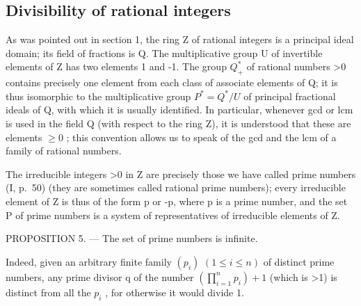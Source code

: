 \subsection{Divisibility of rational integers}

As was pointed out in section 1, the ring Z of rational integers is a principal ideal domain; its field of fractions is Q. The multiplicative group U of invertible elements of Z has two elements 1 and -1. The group \(Q_{+}^{*}\) of rational numbers \textgreater0 contains precisely one element from each class of associate elements of Q; it is thus isomorphic to the multiplicative group \(P^{*} = Q^{*}/U\) of principal fractional ideals of Q, with which it is usually identified. In particular, whenever gcd or lcm is used in the field Q (with respect to the ring Z), it is understood that these are elements \(\geqslant 0\) ; this convention allows us to speak of the gcd and the lcm of a family of rational numbers.

The irreducible integers \textgreater0 in Z are precisely those we have called prime numbers (I, p.~50) (they are sometimes called rational prime numbers); every irreducible element of Z is thus of the form p or -p, where p is a prime number, and the set P of prime numbers is a system of representatives of irreducible elements of Z.

PROPOSITION 5. --- The set of prime numbers is infinite.

Indeed, given an arbitrary finite family \((p_{i})\) \((1 \leqslant i \leqslant n)\) of distinct prime numbers, any prime divisor q of the number \(\left(\prod_{i=1}^{n} p_{i}\right) + 1\) (which is \textgreater1) is distinct from all the \(p_{i}\) , for otherwise it would divide 1.

